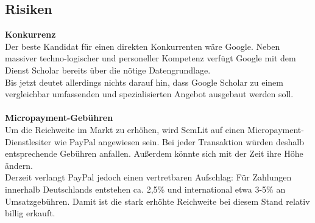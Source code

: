 \subsection{Risiken}
\textbf{Konkurrenz}\\
Der beste Kandidat für einen direkten Konkurrenten wäre Google. Neben massiver techno-logischer und personeller Kompetenz verfügt Google mit dem Dienst Scholar bereits über die nötige Datengrundlage.\\
Bis jetzt deutet allerdings nichts darauf hin, dass Google Scholar zu einem vergleichbar umfassenden und spezialisierten Angebot ausgebaut werden soll. 
\\
\\
\textbf{Micropayment-Gebühren}\\
Um die Reichweite im Markt zu erhöhen, wird SemLit auf einen Micropayment-Dienstlesiter wie PayPal angewiesen sein. Bei jeder Transaktion würden deshalb entsprechende Gebühren anfallen. Außerdem könnte sich mit der Zeit ihre Höhe ändern.\\
Derzeit verlangt PayPal jedoch einen vertretbaren Aufschlag: Für Zahlungen innerhalb Deutschlands entstehen ca. 2,5\% und international etwa 3-5\% an Umsatzgebühren. Damit ist die stark erhöhte Reichweite bei diesem Stand relativ billig erkauft.
